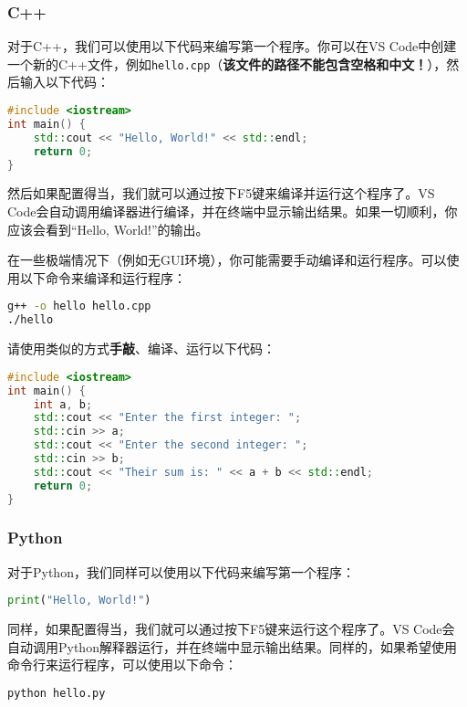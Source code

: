 \subsubsection{C++}

对于C++，我们可以使用以下代码来编写第一个程序。你可以在VS Code中创建一个新的C++文件，例如\texttt{hello.cpp}（\textbf{该文件的路径不能包含空格和中文！}），然后输入以下代码：

\begin{lstlisting}[language=C++]
#include <iostream>
int main() {
    std::cout << "Hello, World!" << std::endl;
    return 0;
}
\end{lstlisting}

然后如果配置得当，我们就可以通过按下F5键来编译并运行这个程序了。VS Code会自动调用编译器进行编译，并在终端中显示输出结果。如果一切顺利，你应该会看到“Hello, World!”的输出。

在一些极端情况下（例如无GUI环境），你可能需要手动编译和运行程序。可以使用以下命令来编译和运行程序：

\begin{lstlisting}[language=bash]
g++ -o hello hello.cpp
./hello
\end{lstlisting}

请使用类似的方式\textbf{手敲}、编译、运行以下代码：

\begin{lstlisting}[language=C++]
#include <iostream>
int main() {
    int a, b;
    std::cout << "Enter the first integer: ";
    std::cin >> a;
    std::cout << "Enter the second integer: ";
    std::cin >> b;
    std::cout << "Their sum is: " << a + b << std::endl;
    return 0;
}
\end{lstlisting}

\subsubsection{Python}

对于Python，我们同样可以使用以下代码来编写第一个程序：

\begin{lstlisting}[language=Python]
print("Hello, World!")
\end{lstlisting}

同样，如果配置得当，我们就可以通过按下F5键来运行这个程序了。VS Code会自动调用Python解释器运行，并在终端中显示输出结果。同样的，如果希望使用命令行来运行程序，可以使用以下命令：

\begin{lstlisting}[language=bash]
python hello.py
\end{lstlisting}

